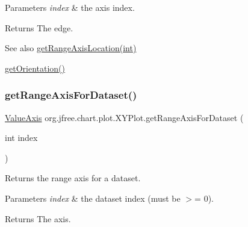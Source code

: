 \begin{DoxyParams}{Parameters}
{\em index} & the axis index.\\
\hline
\end{DoxyParams}
\begin{DoxyReturn}{Returns}
The edge.
\end{DoxyReturn}
\begin{DoxySeeAlso}{See also}
\mbox{\hyperlink{classorg_1_1jfree_1_1chart_1_1plot_1_1_x_y_plot_a8e34e93de05b6fff6f0af0bef7b285d7}{get\+Range\+Axis\+Location(int)}} 

\mbox{\hyperlink{classorg_1_1jfree_1_1chart_1_1plot_1_1_x_y_plot_a5b0c5d43d190ffdfc7cdee341c0e6990}{get\+Orientation()}} 
\end{DoxySeeAlso}
\mbox{\label{classorg_1_1jfree_1_1chart_1_1plot_1_1_x_y_plot_a2f67fc87db74a7e42d23517402f92b02}} 
\subsubsection{\texorpdfstring{get\+Range\+Axis\+For\+Dataset()}{getRangeAxisForDataset()}}
{\footnotesize\ttfamily \mbox{\hyperlink{classorg_1_1jfree_1_1chart_1_1axis_1_1_value_axis}{Value\+Axis}} org.\+jfree.\+chart.\+plot.\+X\+Y\+Plot.\+get\+Range\+Axis\+For\+Dataset (\begin{DoxyParamCaption}\item[{int}]{index }\end{DoxyParamCaption})}

Returns the range axis for a dataset.


\begin{DoxyParams}{Parameters}
{\em index} & the dataset index (must be $>$= 0).\\
\hline
\end{DoxyParams}
\begin{DoxyReturn}{Returns}
The axis. 
\end{DoxyReturn}
\mbox{\label{classorg_1_1jfree_1_1chart_1_1plot_1_1_x_y_plot_abbc15bd6c04c452619c6243b3b8ae35c}} 
